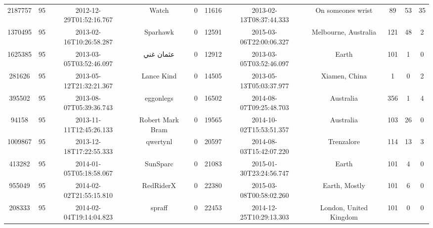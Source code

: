 \documentclass[12pt,a4paper,twoside,openright,titlepage,final]{article}
\begin{document}
\begin{landscape}
\begin{center}
\begin{longtable}{@{\extracolsep{\fill}}*{11}{c}}
			2187757            & 95           & 2012-12-29T01:52:16.767 & Watch                & 0                  & 11616       & 2013-02-13T08:37:44.333 & On someones wrist       & 89                  & 53               & 35             \\
			1370495            & 95           & 2013-02-16T10:26:58.287 & Sparhawk             & 0                  & 12591       & 2015-03-06T22:00:06.327 & Melbourne, Australia    & 121                 & 48               & 2              \\
			1625385            & 95           & 2013-03-05T03:52:46.097 & عثمان غني            & 0                  & 12912       & 2013-03-05T03:52:46.097 & Earth                   & 101                 & 1                & 0              \\
			281626             & 95           & 2013-05-12T21:32:21.367 & Lance Kind           & 0                  & 14505       & 2013-05-13T05:03:37.977 & Xiamen, China           & 1                   & 0                & 2              \\
			395502             & 95           & 2013-08-07T05:39:36.743 & eggonlegs            & 0                  & 16502       & 2014-08-07T09:25:48.703 & Australia               & 356                 & 1                & 4              \\
			94158              & 95           & 2013-11-11T12:45:26.133 & Robert Mark Bram     & 0                  & 19565       & 2014-10-02T15:53:51.357 & Australia               & 103                 & 26               & 0              \\
			1009867            & 95           & 2013-12-18T17:22:55.333 & qwertynl             & 0                  & 20597       & 2014-08-03T15:42:07.220 & Trenzalore              & 114                 & 13               & 3              \\
			413282             & 95           & 2014-01-05T05:18:58.067 & SunSparc             & 0                  & 21083       & 2015-01-30T23:24:56.747 & Earth                   & 101                 & 4                & 0              \\
			955049             & 95           & 2014-02-02T21:55:15.810 & RedRiderX            & 0                  & 22380       & 2015-03-08T00:58:02.260 & Earth, Mostly           & 101                 & 6                & 0              \\
			208333             & 95           & 2014-02-04T19:14:04.823 & spraff               & 0                  & 22453       & 2014-12-25T10:29:13.303 & London, United Kingdom  & 101                 & 0                & 0              \\

\end{longtable}
\end{center}
\end{landscape}
\end{document}
